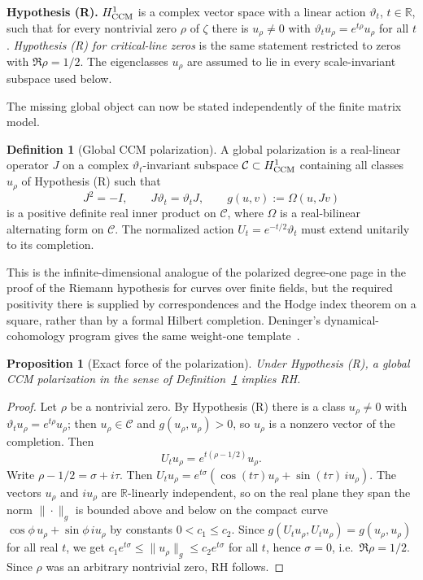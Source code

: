 \documentclass[11pt]{amsart}
\newtheorem{proposition}[theorem]{Proposition}
\theoremstyle{definition}
\newtheorem{definition}[theorem]{Definition}
\theoremstyle{remark}
\newcommand{\R}{\mathbb R}
\begin{document}
\medskip\noindent\textbf{Hypothesis (R).} \(H^1_{\rm CCM}\) is a
complex vector space with a linear action \(\vartheta_t\), \(t\in\R\), such
that for every nontrivial zero \(\rho\) of \(\zeta\) there is
\(u_\rho\neq0\) with \(\vartheta_tu_\rho=e^{t\rho}u_\rho\) for all \(t\).
\emph{Hypothesis (R) for critical-line zeros} is the same statement
restricted to zeros with \(\Re\rho=1/2\).  The eigenclasses \(u_\rho\)
are assumed to lie in every scale-invariant subspace used below.

\medskip\noindent The missing
global object can now be stated independently of the finite matrix model.

\begin{definition}[Global CCM polarization]
\label{def:global-polarization}
A global polarization is a real-linear operator \(J\) on a complex
\(\vartheta_t\)-invariant subspace \(\mathcal C\subset H^1_{\rm CCM}\)
containing all classes \(u_\rho\) of Hypothesis (R) such that
\[
 J^2=-I,
 \qquad
 J\vartheta_t=\vartheta_tJ,
 \qquad
 g(u,v):=\Omega(u,Jv)
 \tag{10.30}
\]
is a positive definite real inner product on \(\mathcal C\), where
\(\Omega\) is a real-bilinear alternating form on \(\mathcal C\).  The normalized action
\(U_t=e^{-t/2}\vartheta_t\) must extend unitarily to its completion.
\end{definition}

This is the infinite-dimensional analogue of the polarized degree-one
page in the proof of the Riemann hypothesis for curves over finite fields,
but the required positivity there is supplied by correspondences and the
Hodge index theorem on a square, rather than by a formal Hilbert
completion.  Deninger's dynamical-cohomology program gives the same
weight-one template~\cite{Deninger1998}.

\begin{proposition}[Exact force of the polarization]
\label{prop:polarization-rh}
Under Hypothesis (R), a global CCM polarization in the sense of
Definition~\ref{def:global-polarization} implies RH.
\end{proposition}

\begin{proof}
Let \(\rho\) be a nontrivial zero.  By Hypothesis (R) there is a class
\(u_\rho\ne0\) with
\(\vartheta_tu_\rho=e^{t\rho}u_\rho\); then \(u_\rho\in\mathcal C\) and
\(g(u_\rho,u_\rho)>0\), so \(u_\rho\) is a nonzero vector of the completion.  Then
\[
 U_tu_\rho=e^{t(\rho-1/2)}u_\rho.
\]
Write \(\rho-1/2=\sigma+i\tau\).  Then
\(U_tu_\rho=e^{t\sigma}(\cos(t\tau)u_\rho+\sin(t\tau)\,iu_\rho)\).  The
vectors \(u_\rho\) and \(iu_\rho\) are \(\mathbb R\)-linearly independent,
so on the real plane they span the norm \(\|\cdot\|_g\) is bounded above and
below on the compact curve \(\cos\phi\,u_\rho+\sin\phi\,iu_\rho\) by
constants \(0<c_1\le c_2\).  Since \(g(U_tu_\rho,U_tu_\rho)=g(u_\rho,u_\rho)\)
for all real \(t\), we get
\(c_1e^{t\sigma}\le\|u_\rho\|_g\le c_2e^{t\sigma}\) for all \(t\), hence
\(\sigma=0\), i.e.\ \(\Re\rho=1/2\).  Since
\(\rho\) was an arbitrary nontrivial zero, RH follows.
\end{proof}
\end{document}
